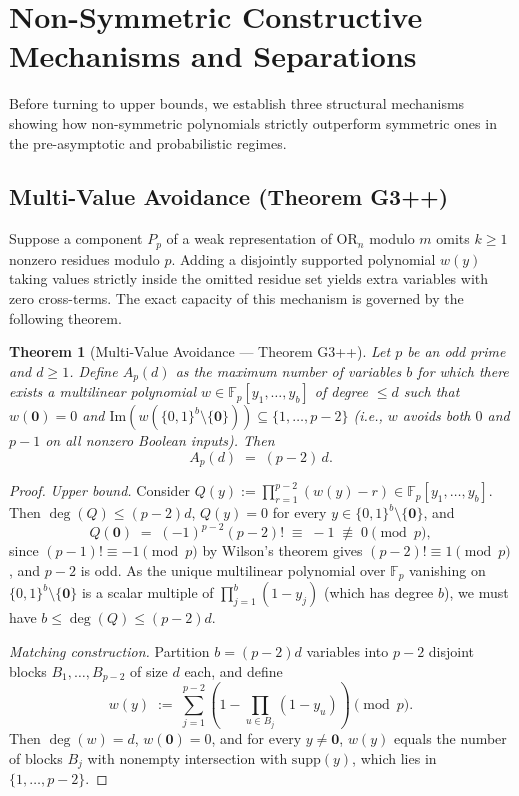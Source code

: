 \documentclass[11pt,a4paper]{article}
\newtheorem{theorem}{Theorem}[section]
\theoremstyle{definition}
\newcommand{\F}{\mathbb{F}}
\newcommand{\OR}{\mathrm{OR}}
\newcommand{\supp}{\mathrm{supp}}
\newcommand{\ImSet}{\mathrm{Im}}
\begin{document}
\section{Non-Symmetric Constructive Mechanisms and Separations}
\label{sec:mechanisms}

Before turning to upper bounds, we establish three structural mechanisms showing how non-symmetric polynomials strictly outperform symmetric ones in the pre-asymptotic and probabilistic regimes.

\subsection{Multi-Value Avoidance (Theorem G3++)}

Suppose a component $P_p$ of a weak representation of $\OR_n$ modulo $m$ omits $k \ge 1$ nonzero residues modulo $p$. Adding a disjointly supported polynomial $w(y)$ taking values strictly inside the omitted residue set yields extra variables with zero cross-terms. The exact capacity of this mechanism is governed by the following theorem.

\begin{theorem}[Multi-Value Avoidance --- Theorem G3++]
\label{thm:g3pp}
Let $p$ be an odd prime and $d \ge 1$. Define $A_p(d)$ as the maximum number of variables $b$ for which there exists a multilinear polynomial $w \in \F_p[y_1,\dots,y_b]$ of degree $\le d$ such that $w(\mathbf{0}) = 0$ and $\ImSet(w(\{0,1\}^b \setminus \{\mathbf{0}\})) \subseteq \{1,\dots,p-2\}$ (i.e., $w$ avoids both $0$ and $p-1$ on all nonzero Boolean inputs). Then
\[
  A_p(d) \;=\; (p - 2)\, d.
\]
\end{theorem}

\begin{proof}
\emph{Upper bound.} Consider $Q(y) := \prod_{r=1}^{p-2} (w(y) - r) \in \F_p[y_1,\dots,y_b]$. Then $\deg(Q) \le (p-2)d$, $Q(y) = 0$ for every $y \in \{0,1\}^b \setminus \{\mathbf{0}\}$, and
\[
  Q(\mathbf{0}) \;=\; (-1)^{p-2}(p-2)! \;\equiv\; -1 \;\not\equiv\; 0 \pmod p,
\]
since $(p-1)! \equiv -1 \pmod p$ by Wilson's theorem gives $(p-2)! \equiv 1 \pmod p$, and $p - 2$ is odd. As the unique multilinear polynomial over $\F_p$ vanishing on $\{0,1\}^b \setminus \{\mathbf{0}\}$ is a scalar multiple of $\prod_{j=1}^b (1 - y_j)$ (which has degree $b$), we must have $b \le \deg(Q) \le (p-2)d$.

\emph{Matching construction.} Partition $b = (p-2)d$ variables into $p-2$ disjoint blocks $B_1,\dots,B_{p-2}$ of size $d$ each, and define
\[
  w(y) \;:=\; \sum_{j=1}^{p-2} \left(1 - \prod_{u \in B_j} (1 - y_u)\right) \pmod p.
\]
Then $\deg(w) = d$, $w(\mathbf{0}) = 0$, and for every $y \neq \mathbf{0}$, $w(y)$ equals the number of blocks $B_j$ with nonempty intersection with $\supp(y)$, which lies in $\{1,\dots,p-2\}$.
\end{proof}
\end{document}
